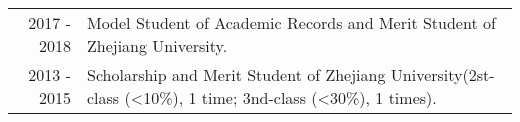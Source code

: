 %
%





\begin{tabular}{rl}	
	\textsc{2017 - 2018} & Model Student of Academic Records and Merit Student of Zhejiang University.\\
	\textsc{2013 - 2015} & Scholarship and Merit Student of Zhejiang University(2st-class (<10\%), 1 time; 3nd-class (<30\%), 1 times).\\	
\end{tabular}